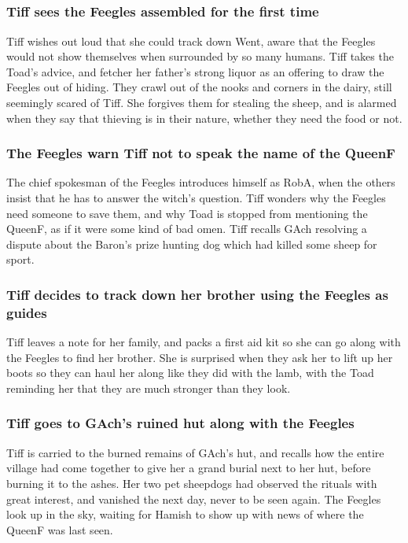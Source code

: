 \subsection{}
\subsubsection{\Gls{Tiff} sees the Feegles assembled for the first time}
\Gls{Tiff} wishes out loud that she could track down \Gls{Went}, aware that the Feegles would not
show themselves when surrounded by so many humans. \Gls{Tiff} takes the \Gls{Toad}'s advice, and
fetcher her father's strong liquor as an offering to draw the Feegles out of hiding. They crawl
out of the nooks and corners in the dairy, still seemingly scared of \Gls{Tiff}. She forgives them
for stealing the sheep, and is alarmed when they say that thieving is in their nature, whether they
need the food or not.

\subsubsection{The Feegles warn \Gls{Tiff} not to speak the name of the \Gls{QueenF}}
The chief spokesman of the Feegles introduces himself as \Gls{RobA}, when the others insist that he
has to answer the witch's question. \Gls{Tiff} wonders why the Feegles need someone to save them,
and why \Gls{Toad} is stopped from mentioning the \Gls{QueenF}, as if it were some kind of bad omen.
\Gls{Tiff} recalls \Gls{GAch} resolving a dispute about the \Gls{Baron}'s prize hunting dog which
had killed some sheep for sport.

\subsubsection{\Gls{Tiff} decides to track down her brother using the Feegles as guides}
\Gls{Tiff} leaves a note for her family, and packs a first aid kit so she can go along with the
Feegles to find her brother. She is surprised when they ask her to lift up her boots so they can
haul her along like they did with the lamb, with the \Gls{Toad} reminding her that they are much
stronger than they look.

\subsubsection{\Gls{Tiff} goes to \Gls{GAch}'s ruined hut along with the Feegles}
\Gls{Tiff} is carried to the burned remains of \Gls{GAch}'s hut, and recalls how the entire village
had come together to give her a grand burial next to her hut, before burning it to the ashes. Her
two pet sheepdogs had observed the rituals with great interest, and vanished the next day, never to
be seen again. The Feegles look up in the sky, waiting for \Gls{Hamish} to show up with news of
where the \Gls{QueenF} was last seen.

